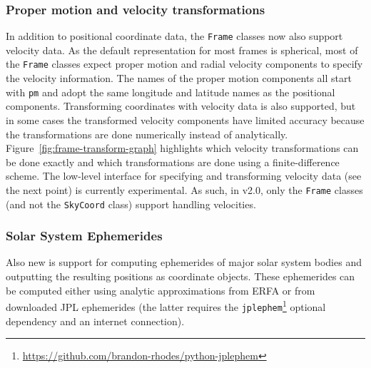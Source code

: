 \documentclass[modern]{aastex61}
\newcommand{\package}[1]{\texttt{#1}\xspace}
\renewcommand{\figurename}{Figure\xspace}
\newcommand{\inlinecomment}[2]{\todo[inline]{#1: #2}\xspace}
\begin{document}
\subsubsection{Proper motion and velocity transformations}
    In addition to positional coordinate data, the \texttt{Frame} classes now
    also support velocity data.
    As the default representation for most frames is spherical, most of the
    \texttt{Frame} classes expect proper motion and radial velocity components
    to specify the velocity information.
    The names of the proper motion components all start with \texttt{pm} and
    adopt the same longitude and latitude names as the positional components.
    Transforming coordinates with velocity data is also supported, but in some
    cases the transformed velocity components have limited accuracy because the
    transformations are done numerically instead of analytically.
    \figurename~\ref{fig:frame-transform-graph} highlights which
    velocity transformations can be done exactly and which transformations are
    done using a finite-difference scheme.
    The low-level interface for specifying and transforming velocity data (see
    the next point) is currently experimental.
    As such, in v2.0, only the \texttt{Frame} classes (and not the
    \texttt{SkyCoord} class) support handling velocities.




\subsubsection{Solar System Ephemerides}
    Also new is support for computing ephemerides of major solar system bodies
    and outputting the resulting positions as coordinate objects.
    These ephemerides can be computed either using analytic approximations from
    ERFA or from downloaded JPL ephemerides (the latter requires the
    \package{jplephem}\footnote{\url{https://github.com/brandon-rhodes/python-jplephem}}
    optional dependency and an internet connection).
\end{document}
